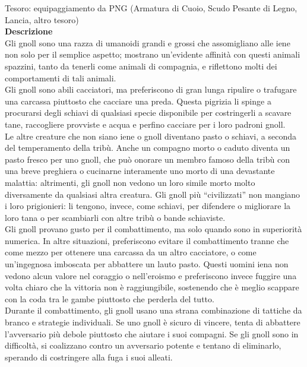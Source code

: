 \begin{multicols}{2}
Tesoro: equipaggiamento da PNG (Armatura di Cuoio, Scudo Pesante di Legno, Lancia, altro tesoro)\\
\textbf{Descrizione}\\
Gli gnoll sono una razza di umanoidi grandi e grossi che assomigliano alle iene non solo per il semplice aspetto; mostrano un'evidente affinità con questi animali spazzini, tanto da tenerli come animali di compagnia, e riflettono molti dei comportamenti di tali animali.\\

Gli gnoll sono abili cacciatori, ma preferiscono di gran lunga ripulire o trafugare una carcassa piuttosto che cacciare una preda. Questa pigrizia li spinge a procurarsi degli schiavi di qualsiasi specie disponibile per costringerli a scavare tane, raccogliere provviste e acqua e perfino cacciare per i loro padroni gnoll.\\

Le altre creature che non siano iene o gnoll diventano pasto o schiavi, a seconda del temperamento della tribù. Anche un compagno morto o caduto diventa un pasto fresco per uno gnoll, che può onorare un membro famoso della tribù con una breve preghiera o cucinarne interamente uno morto di una devastante malattia: altrimenti, gli gnoll non vedono un loro simile morto molto diversamente da qualsiasi altra creatura. Gli gnoll più “civilizzati” non mangiano i loro prigionieri: li tengono, invece, come schiavi, per difendere o migliorare la loro tana o per scambiarli con altre tribù o bande schiaviste.\\

Gli gnoll provano gusto per il combattimento, ma solo quando sono in superiorità numerica. In altre situazioni, preferiscono evitare il combattimento tranne che come mezzo per ottenere una carcassa da un altro cacciatore, o come un'ingegnosa imboscata per abbattere un lauto pasto. Questi uomini iena non vedono alcun valore nel coraggio o nell'eroismo e preferiscono invece fuggire una volta chiaro che la vittoria non è raggiungibile, sostenendo che è meglio scappare con la coda tra le gambe piuttosto che perderla del tutto.\\

Durante il combattimento, gli gnoll usano una strana combinazione di tattiche da branco e strategie individuali. Se uno gnoll è sicuro di vincere, tenta di abbattere l'avversario più debole piuttosto che aiutare i suoi compagni. Se gli gnoll sono in difficoltà, si coalizzano contro un avversario potente e tentano di eliminarlo, sperando di costringere alla fuga i suoi alleati.\\


\end{multicols}
